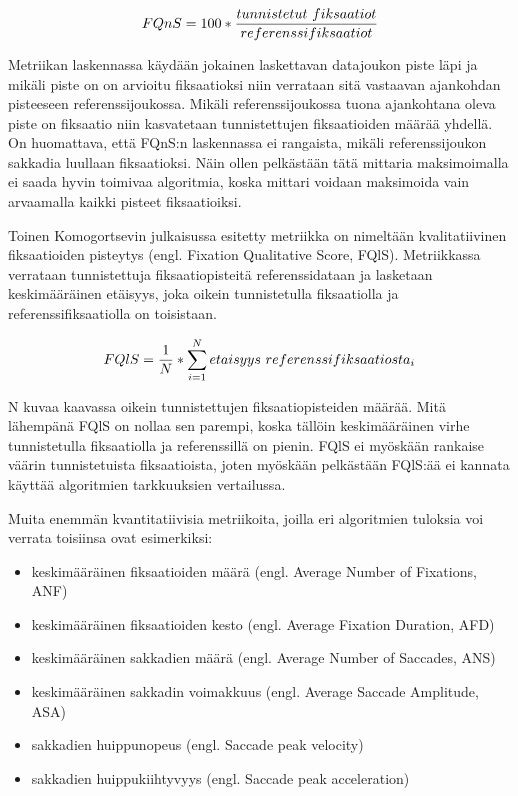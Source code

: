 \[
FQnS = 100 * {{tunnistetut\ fiksaatiot} \over {referenssifiksaatiot}}
\]
 
 Metriikan laskennassa käydään jokainen laskettavan datajoukon piste läpi ja mikäli piste on on arvioitu fiksaatioksi niin verrataan sitä vastaavan ajankohdan pisteeseen referenssijoukossa. Mikäli referenssijoukossa tuona ajankohtana oleva piste on fiksaatio niin kasvatetaan tunnistettujen fiksaatioiden määrää yhdellä. On huomattava, että FQnS:n laskennassa ei rangaista, mikäli referenssijoukon sakkadia luullaan fiksaatioksi. Näin ollen pelkästään tätä mittaria maksimoimalla ei saada hyvin toimivaa algoritmia, koska mittari voidaan maksimoida vain arvaamalla kaikki pisteet fiksaatioiksi.
 
 Toinen Komogortsevin julkaisussa esitetty metriikka on nimeltään kvalitatiivinen fiksaatioiden pisteytys (engl. Fixation Qualitative Score, FQlS). Metriikkassa verrataan tunnistettuja fiksaatiopisteitä referenssidataan ja lasketaan keskimääräinen etäisyys, joka oikein tunnistetulla fiksaatiolla ja referenssifiksaatiolla on toisistaan. 

\[
FQlS = {1 \over N} * \sum\limits_{i=1}^N etaisyys\ referenssifiksaatiosta_i
\]

N kuvaa kaavassa oikein tunnistettujen fiksaatiopisteiden määrää. Mitä lähempänä FQlS on nollaa sen parempi, koska tällöin keskimääräinen virhe tunnistetulla fiksaatiolla ja referenssillä on pienin. FQlS ei myöskään rankaise väärin tunnistetuista fiksaatioista, joten myöskään pelkästään FQlS:ää ei kannata käyttää algoritmien tarkkuuksien vertailussa.

Muita enemmän kvantitatiivisia metriikoita, joilla eri algoritmien tuloksia voi verrata toisiinsa ovat esimerkiksi:
\begin{itemize}
  \item keskimääräinen fiksaatioiden määrä (engl. Average Number of Fixations, ANF)
  \item keskimääräinen fiksaatioiden kesto (engl. Average Fixation Duration, AFD)
  \item keskimääräinen sakkadien määrä (engl. Average Number of Saccades, ANS)
	\item keskimääräinen sakkadin voimakkuus (engl. Average Saccade Amplitude, ASA)
	\item sakkadien huippunopeus (engl. Saccade peak velocity)
	\item sakkadien huippukiihtyvyys (engl. Saccade peak acceleration)
	
\end{itemize} \citep[s. 4]{komogortsev2010} \citep[s. 195]{nystrom2010}

